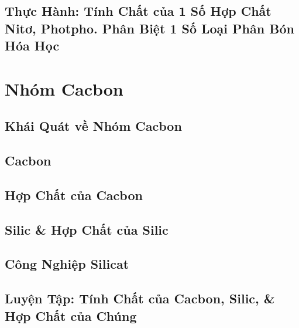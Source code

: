 \documentclass[oneside]{book}
\numberwithin{equation}{section}
\begin{document}

\section{Thực Hành: Tính Chất của 1 Số Hợp Chất Nitơ, Photpho. Phân Biệt 1 Số Loại Phân Bón Hóa Học}


\chapter{Nhóm Cacbon}

\section{Khái Quát về Nhóm Cacbon}


\section{Cacbon}


\section{Hợp Chất của Cacbon}


\section{Silic \& Hợp Chất của Silic}


\section{Công Nghiệp Silicat}


\section{Luyện Tập: Tính Chất của Cacbon, Silic, \& Hợp Chất của Chúng}
\end{document}
